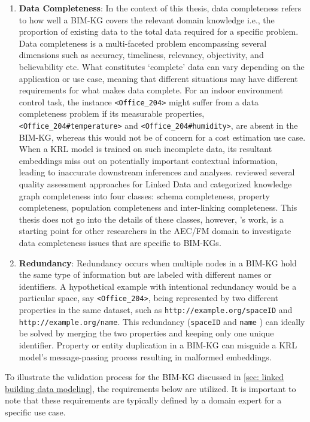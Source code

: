 \begin{enumerate}
    \item 
    \textbf{Data Completeness}: In the context of this thesis, data completeness refers to how well a \ac{BIM-KG} covers the relevant domain knowledge i.e., the proportion of existing data to the total data required for a specific problem. Data completeness is a multi-faceted problem encompassing several dimensions such as accuracy, timeliness, relevancy, objectivity, and believability etc. What constitutes `complete' data can vary depending on the application or use case, meaning that different situations may have different requirements for what makes data complete. For an indoor environment control task, the instance \texttt{<Office\_204>} might suffer from a data completeness problem if its measurable properties, \texttt{<Office\_204\#temperature>} and \texttt{<Office\_204\#humidity>}, are absent in the \ac{BIM-KG}, whereas this would not be of concern for a cost estimation use case.  When a \ac{KRL} model is trained on such incomplete data, its resultant embeddings miss out on potentially important contextual information, leading to inaccurate downstream inferences and analyses. \cite{Zaveri2016QualitySurvey} reviewed several quality assessment approaches for Linked Data and categorized knowledge graph completeness into four classes: schema completeness, property completeness, population completeness and inter-linking completeness. This thesis does not go into the details of these classes, however, \cite{Zaveri2016QualitySurvey}'s work, is a starting point for other researchers in the \ac{AEC/FM} domain to investigate data completeness issues that are specific to \acp{BIM-KG}.

    \item 
    \textbf{Redundancy}: Redundancy occurs when multiple nodes in a \ac{BIM-KG} hold the same type of information but are labeled with different names or identifiers. A hypothetical example with intentional redundancy would be a particular space, say \texttt{<Office\_204>}, being represented by two different properties in the same dataset, such as \texttt{http://example.org/spaceID} and \texttt{http://example.org/name}. This redundancy (\texttt{spaceID} and \texttt{name} ) can ideally be solved by merging the two properties and keeping only one unique identifier. Property or entity duplication in a \ac{BIM-KG} can misguide a \ac{KRL} model's message-passing process resulting in malformed embeddings.
\end{enumerate}

\noindent To illustrate the validation process for the \ac{BIM-KG} discussed in \autoref{sec: linked building data modeling}, the requirements below are utilized. It is important to note that these requirements are typically defined by a domain expert for a specific use case. 

